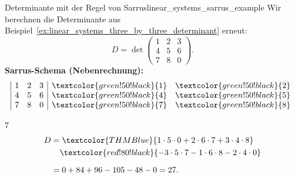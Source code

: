 \IfClozeTF{\clearpage}{}
\begin{ExampleBox}{Determinante mit der Regel von Sarrus}{linear_systems_sarrus_example}
  Wir berechnen die Determinante aus
  Beispiel~\ref{ex:linear_systems_three_by_three_determinant} erneut:
  \[
    D=\det\!\begin{pmatrix}
      1&2&3\\
      4&5&6\\
      7&8&0
    \end{pmatrix}.
  \]
  \noindent\textbf{Sarrus-Schema (Nebenrechnung):}
  \[
    \begin{array}{|ccc|cc}
      1&2&3&\textcolor{green!50!black}{1}&\textcolor{green!50!black}{2}\\
      4&5&6&\textcolor{green!50!black}{4}&\textcolor{green!50!black}{5}\\
      7&8&0&\textcolor{green!50!black}{7}&\textcolor{green!50!black}{8}
    \end{array}
  \]
  \begin{ClozeArea}[32]{7}
    \[
      \begin{aligned}
        D
        &=\textcolor{THMBlue}{1\cdot5\cdot0+2\cdot6\cdot7+3\cdot4\cdot8}\\
        &\phantom{={}}\textcolor{red!80!black}{-3\cdot5\cdot7-1\cdot6\cdot8-2\cdot4\cdot0}\\[0.6em]
        &=0+84+96-105-48-0=27.
      \end{aligned}
    \]
  \end{ClozeArea}
\end{ExampleBox}
